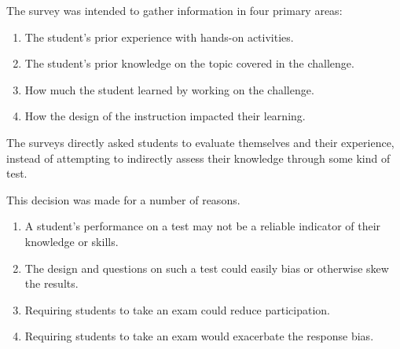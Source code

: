 The survey was intended to gather information in four primary areas:



    \begin{enumerate}



        \item The student's prior experience with hands-on activities.



        \item The student's prior knowledge on the topic covered in the challenge.



        \item How much the student learned by working on the challenge.



        \item How the design of the instruction impacted their learning. 



    \end{enumerate}



    



    The surveys directly asked students to evaluate themselves and their experience, instead of attempting to indirectly assess their knowledge through some kind of test. %



This decision was made for a number of reasons. 



    \begin{enumerate}



        \item A student's performance on a test may not be a reliable indicator of their knowledge or skills.



        \item The design and questions on such a test could easily bias or otherwise skew the results. 



        \item Requiring students to take an exam could reduce participation. 



        \item Requiring students to take an exam would exacerbate the response bias.



    \end{enumerate}







